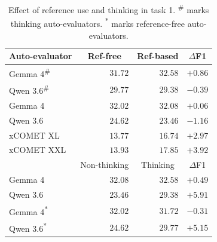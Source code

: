 \begin{table}[t]
\centering
\small
\begin{tabular}{lrrr}

\toprule

\textbf{Auto-evaluator} & \multicolumn{1}{c}{Ref-free} & \multicolumn{1}{c}{Ref-based} & \multicolumn{1}{c}{$\Delta$F1} \\
\midrule
Gemma 4\textsuperscript{\#} & $31.72$ & $32.58$ & $+0.86$ \\
Qwen 3.6\textsuperscript{\#} & $29.77$ & $29.38$ & $-0.39$ \\
Gemma 4 & $32.02$ & $32.08$ & $+0.06$ \\
Qwen 3.6 & $24.62$ & $23.46$ & $-1.16$ \\
xCOMET XL & $13.77$ & $16.74$ & $+2.97$ \\
xCOMET XXL & $13.93$ & $17.85$ & $+3.92$ \\

\midrule

& \multicolumn{1}{c}{Non-thinking} & \multicolumn{1}{c}{Thinking} & \multicolumn{1}{c}{$\Delta$F1} \\
\midrule
Gemma 4 & $32.08$ & $32.58$ & $+0.49$ \\
Qwen 3.6 & $23.46$ & $29.38$ & $+5.91$ \\
Gemma 4\textsuperscript{*} & $32.02$ & $31.72$ & $-0.31$ \\
Qwen 3.6\textsuperscript{*} & $24.62$ & $29.77$ & $+5.15$ \\

\bottomrule
\end{tabular}
\caption{Effect of reference use and thinking in task 1. \textsuperscript{\#} marks thinking auto-evaluators. \textsuperscript{*} marks reference-free auto-evaluators.}
\label{tab:task1-reference-thinking-effect}
\end{table}
